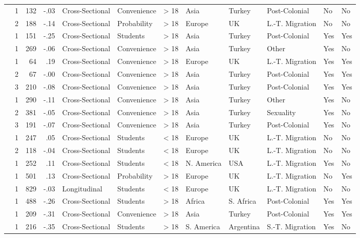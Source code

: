 \documentclass[10pt, letterpaper]{article}
\begin{document}
\begin{landscape}
\begin{xltabular}{650pt}{Xrrrllrlllll}
\cite{2395} & 1 & 132 & -.03 & Cross-Sectional & Convenience & > 18 & Asia & Turkey & Post-Colonial & No & No\\
 & 2 & 188 & -.14 & Cross-Sectional & Probability & > 18 & Europe & UK & L.-T. Migration & No & No\\
\cite{322} & 1 & 151 & -.25 & Cross-Sectional & Students & > 18 & Asia & Turkey & Post-Colonial & Yes & Yes\\
\cite{2257} & 1 & 269 & -.06 & Cross-Sectional & Convenience & > 18 & Asia & Turkey & Other & Yes & No\\
\cite{423} & 1 & 64 & .19 & Cross-Sectional & Convenience & > 18 & Europe & UK & L.-T. Migration & Yes & Yes\\
 & 2 & 67 & -.00 & Cross-Sectional & Convenience & > 18 & Asia & Turkey & Post-Colonial & Yes & Yes\\
 & 3 & 210 & -.08 & Cross-Sectional & Convenience & > 18 & Asia & Turkey & Post-Colonial & Yes & Yes\\
\cite{2396} & 1 & 290 & -.11 & Cross-Sectional & Convenience & > 18 & Asia & Turkey & Other & Yes & No\\
 & 2 & 381 & -.05 & Cross-Sectional & Convenience & > 18 & Asia & Turkey & Sexuality & Yes & No\\
 & 3 & 191 & -.07 & Cross-Sectional & Convenience & > 18 & Asia & Turkey & Post-Colonial & Yes & No\\
\cite{2023} & 1 & 247 & .05 & Cross-Sectional & Students & < 18 & Europe & UK & L.-T. Migration & No & No\\
 & 2 & 118 & -.04 & Cross-Sectional & Students & < 18 & Europe & UK & L.-T. Migration & No & No\\
\cite{1045} & 1 & 252 & .11 & Cross-Sectional & Students & < 18 & N. America & USA & L.-T. Migration & Yes & No\\
\cite{2397} & 1 & 501 & .13 & Cross-Sectional & Probability & > 18 & Europe & UK & L.-T. Migration & No & Yes\\
\cite{2398} & 1 & 829 & -.03 & Longitudinal & Students & < 18 & Europe & UK & L.-T. Migration & No & No\\
\cite{284} & 1 & 488 & -.26 & Cross-Sectional & Students & > 18 & Africa & S. Africa & Post-Colonial & Yes & Yes\\
\cite{1248} & 1 & 209 & -.31 & Cross-Sectional & Convenience & > 18 & Asia & Turkey & Post-Colonial & Yes & Yes\\
\cite{1914} & 1 & 216 & -.35 & Cross-Sectional & Students & > 18 & S. America & Argentina & S.-T. Migration & Yes & No\\

\end{xltabular}
\end{landscape}
\end{document}
